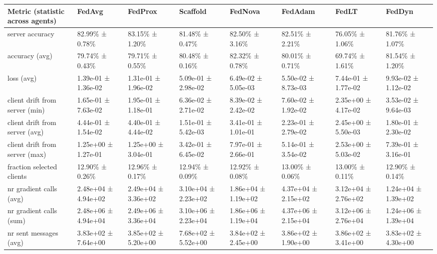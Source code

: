 \begin{tabular}{llllllll}
\hline
 Metric (statistic across agents)   & FedAvg              & FedProx             & Scaffold            & FedNova             & FedAdam             & FedLT               & FedDyn              \\
\hline
 server accuracy                    & 82.99\% ± 0.78\%      & 83.15\% ± 1.20\%      & 81.48\% ± 0.47\%      & 82.50\% ± 3.16\%      & 82.51\% ± 2.21\%      & 76.05\% ± 1.06\%      & 81.76\% ± 1.07\%      \\
 accuracy (avg)                     & 79.74\% ± 0.43\%      & 79.71\% ± 0.55\%      & 80.48\% ± 0.16\%      & 82.32\% ± 0.78\%      & 80.01\% ± 0.71\%      & 69.74\% ± 1.61\%      & 81.54\% ± 1.20\%      \\
 loss (avg)                         & 1.39e-01 ± 1.36e-02 & 1.31e-01 ± 1.96e-02 & 5.09e-01 ± 2.98e-02 & 6.49e-02 ± 5.05e-03 & 5.50e-02 ± 8.73e-03 & 7.44e-01 ± 1.77e-02 & 9.93e-02 ± 1.12e-02 \\
 client drift from server (min)     & 1.65e-01 ± 7.63e-02 & 1.95e-01 ± 1.18e-01 & 6.36e-02 ± 2.71e-02 & 8.39e-02 ± 2.42e-02 & 7.60e-02 ± 1.92e-02 & 2.35e+00 ± 4.17e-02 & 3.53e-02 ± 9.64e-03 \\
 client drift from server (avg)     & 4.44e-01 ± 1.54e-02 & 4.40e-01 ± 4.44e-02 & 1.51e-01 ± 5.42e-03 & 3.41e-01 ± 1.01e-01 & 2.23e-01 ± 2.79e-02 & 2.45e+00 ± 5.50e-03 & 1.80e-01 ± 2.30e-02 \\
 client drift from server (max)     & 1.25e+00 ± 1.27e-01 & 1.25e+00 ± 3.04e-01 & 3.42e-01 ± 6.45e-02 & 7.97e-01 ± 2.66e-01 & 5.14e-01 ± 3.54e-02 & 2.53e+00 ± 5.03e-02 & 7.39e-01 ± 3.16e-01 \\
 fraction selected clients          & 12.90\% ± 0.26\%      & 12.96\% ± 0.17\%      & 12.94\% ± 0.09\%      & 12.92\% ± 0.08\%      & 13.00\% ± 0.06\%      & 13.00\% ± 0.11\%      & 12.90\% ± 0.14\%      \\
 nr gradient calls (avg)            & 2.48e+04 ± 4.94e+02 & 2.49e+04 ± 3.36e+02 & 3.10e+04 ± 2.23e+02 & 1.86e+04 ± 1.19e+02 & 4.37e+04 ± 2.15e+02 & 3.12e+04 ± 2.76e+02 & 1.24e+04 ± 1.39e+02 \\
 nr gradient calls (sum)            & 2.48e+06 ± 4.94e+04 & 2.49e+06 ± 3.36e+04 & 3.10e+06 ± 2.23e+04 & 1.86e+06 ± 1.19e+04 & 4.37e+06 ± 2.15e+04 & 3.12e+06 ± 2.76e+04 & 1.24e+06 ± 1.39e+04 \\
 nr sent messages (avg)             & 3.83e+02 ± 7.64e+00 & 3.85e+02 ± 5.20e+00 & 7.68e+02 ± 5.52e+00 & 3.84e+02 ± 2.45e+00 & 3.86e+02 ± 1.90e+00 & 3.86e+02 ± 3.41e+00 & 3.83e+02 ± 4.30e+00 \\

\end{tabular}
